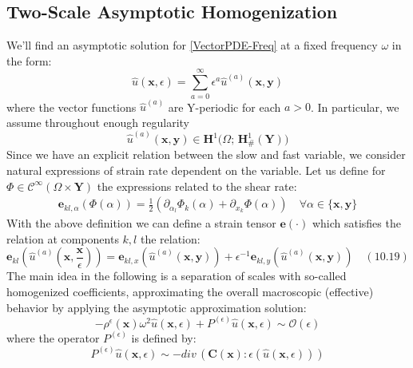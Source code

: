 \subsection{Two-Scale Asymptotic Homogenization}
We'll find an asymptotic solution for \ref{VectorPDE-Freq} at a fixed frequency $\omega$ in the form:
\begin{equation*}
    \label{AsymptoticExpansion}
    \hat{u}(\mathbf{x},\epsilon) = \sum_{a=0}^{\infty} \epsilon^a \hat{u}^{(a)}(\mathbf{x},\mathbf{y}) 
\end{equation*}
where the vector functions $\hat{u}^{(a)}$ are Y-periodic for each $a >0$. 
In particular, we assume throughout enough regularity
\begin{equation*}
    \hat{u}^{(a)}(\mathbf{x},\mathbf{y}) \in \mathbf{H}^1\big(\Omega; \, \mathbf{H}^1_{\#}(\mathbf{Y})\big)
\end{equation*}
Since we have an explicit relation between the slow and fast variable, we consider natural expressions of strain rate dependent on the variable. Let us define for $\Phi \in \mathcal{C}^{\infty}(\Omega \times \mathbf{Y})$ the expressions related to the shear rate:
\begin{align*}
    \mathbf{e}_{kl,\alpha} (\Phi(\alpha)) = \frac{1}{2}(\partial_{\alpha_l} \Phi_k (\alpha) + \partial_{x_k} \Phi (\alpha)) \quad \forall \alpha \in \{\mathbf{x}, \mathbf{y}\}
\end{align*}
With the above definition we can define a strain tensor $\mathbf{e}(\cdot)$ which satisfies the relation at components $k,l$ the relation:
\begin{equation}
    \label{Multiscale-Strain}
    \mathbf{e}_{kl} ( \hat{u}^{(a)}(\mathbf{x}, \frac{\mathbf{x}}{\epsilon})) = \mathbf{e}_{kl,x}( \hat{u}^{(a)} (\mathbf{x},\mathbf{y})) + \epsilon^{-1} \mathbf{e}_{kl,y} (\hat{u}^{(a)}(\mathbf{x},\mathbf{y})) \quad (10.19)
\end{equation}
The main idea in the following is a separation of scales with so-called homogenized coefficients, approximating the overall macroscopic (effective) behavior by applying the asymptotic approximation solution:
\begin{equation*}
    -\rho^{\epsilon}(\mathbf{x}) \omega^2 \hat{u}(\mathbf{x}, \epsilon) + P^{(\epsilon)}\hat{u}(\mathbf{x},\epsilon) \sim \mathcal{O}(\epsilon) 
\end{equation*}
where the operator $P^{(\epsilon)}$ is defined by:
\begin{equation}
    \label{P-Operator}
    P^{(\epsilon)}\hat{u}(\mathbf{x},\epsilon) \sim - div \, (\mathbf{C}(\mathbf{x}): \epsilon(\hat{u}(\mathbf{x},\epsilon)))
\end{equation}

